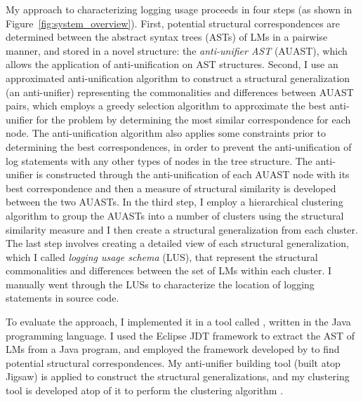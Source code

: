 My approach to characterizing logging usage proceeds in four steps (as shown in Figure~\ref{fig:system_overview}). First, potential structural correspondences are determined between the abstract syntax trees (ASTs) of LMs in a pairwise manner, and stored in a novel structure: the \emph{anti-unifier AST} (AUAST), which allows the application of anti-unification on AST structures. Second, I use an approximated anti-unification algorithm to construct a structural generalization (an anti-unifier) representing the commonalities and differences between AUAST pairs, which employs a greedy selection algorithm to approximate the best anti-unifier for the problem by determining the most similar correspondence for each node. The anti-unification algorithm also applies some constraints prior to determining the best correspondences, in order to prevent the anti-unification of log statements with any other types of nodes in the tree structure. The anti-unifier is constructed through the anti-unification of each AUAST node with its best correspondence and then a measure of structural similarity is developed between the two AUASTs.
In the third step, I employ a hierarchical clustering algorithm to group the AUASTs into a number of clusters using the structural similarity measure and I then create a structural generalization from each cluster. The last step involves creating a detailed view of each structural generalization, which I called \emph{logging usage schema} (LUS), that represent the structural commonalities and differences between the set of LMs within each cluster. I manually went through the LUSs to characterize the location of logging statements in source code.

To evaluate the approach, I implemented it in a tool called , written in the Java programming language. I used the Eclipse JDT framework to extract the AST of LMs from a Java program, and employed the  framework developed by \citet{2008:fse:cottrell} to find potential structural correspondences. My anti-unifier building tool (built atop Jigsaw) is applied to construct the structural generalizations, and my clustering tool is developed atop of it to perform the clustering algorithm .

